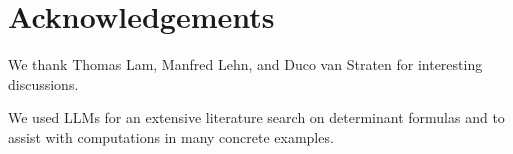 \section*{Acknowledgements}
We thank Thomas Lam, Manfred Lehn, and Duco van Straten for
interesting discussions.

We used LLMs for an extensive literature search on determinant formulas
and to assist with computations in many concrete examples.
